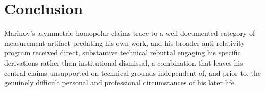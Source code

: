 \documentclass[11pt]{article}
\begin{document}
\section{Conclusion}

Marinov's asymmetric homopolar claims trace to a well-documented category of measurement artifact predating his own work, and his broader anti-relativity program received direct, substantive technical rebuttal engaging his specific derivations rather than institutional dismissal, a combination that leaves his central claims unsupported on technical grounds independent of, and prior to, the genuinely difficult personal and professional circumstances of his later life.
\end{document}
